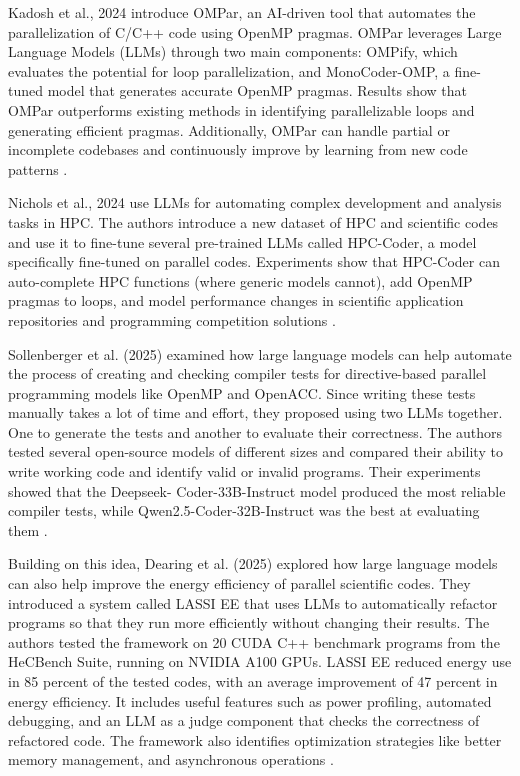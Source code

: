 \documentclass[conference]{IEEEtran}
\begin{document}
Kadosh et al., 2024 introduce OMPar, an AI-driven tool that automates the parallelization of C/C++ code using OpenMP pragmas. OMPar leverages Large Language Models (LLMs) through two main components: OMPify, which evaluates the potential for loop parallelization, and MonoCoder-OMP, a fine-tuned model that generates accurate OpenMP pragmas. Results show that OMPar outperforms existing methods in identifying parallelizable loops and generating efficient pragmas. Additionally, OMPar can handle partial or incomplete codebases and continuously improve by learning from new code patterns \cite{Kadosh2024OMParAP}.


Nichols et al., 2024 use LLMs for automating complex development and analysis tasks in HPC. The authors introduce a new dataset of HPC and scientific codes and use it to fine-tune several pre-trained LLMs called HPC-Coder, a model specifically fine-tuned on parallel codes. Experiments show that HPC-Coder can auto-complete HPC functions (where generic models cannot), add OpenMP pragmas to loops, and model performance changes in scientific application repositories and programming competition solutions \cite{Nichols2024}.

Sollenberger et al. (2025) examined how large language models can help automate the process of creating and checking compiler tests for directive-based parallel programming models like OpenMP and OpenACC. Since writing these tests manually takes a lot of time and effort, they proposed using two LLMs together. One to generate the tests and another to evaluate their correctness. The authors tested several open-source models of different sizes and compared their ability to write working code and identify valid or invalid programs. Their experiments showed that the Deepseek- Coder-33B-Instruct model produced the most reliable compiler tests, while Qwen2.5-Coder-32B-Instruct was the best at evaluating them \cite{sollenberger2025llm4vvevaluatingcuttingedgellms}.

Building on this idea, Dearing et al. (2025) explored how large language models can also help improve the energy efficiency of parallel scientific codes. They introduced a system called LASSI EE that uses LLMs to automatically refactor programs so that they run more efficiently without changing their results. The authors tested the framework on 20 CUDA C++ benchmark programs from the HeCBench Suite, running on NVIDIA A100 GPUs. LASSI EE reduced energy use in 85 percent of the tested codes, with an average improvement of 47 percent in energy efficiency. It includes useful features such as power profiling, automated debugging, and an LLM as a judge component that checks the correctness of refactored code. The framework also identifies optimization strategies like better memory management, and asynchronous operations \cite{dearing2025leveragingllmsautomateenergyaware}. 
\end{document}
